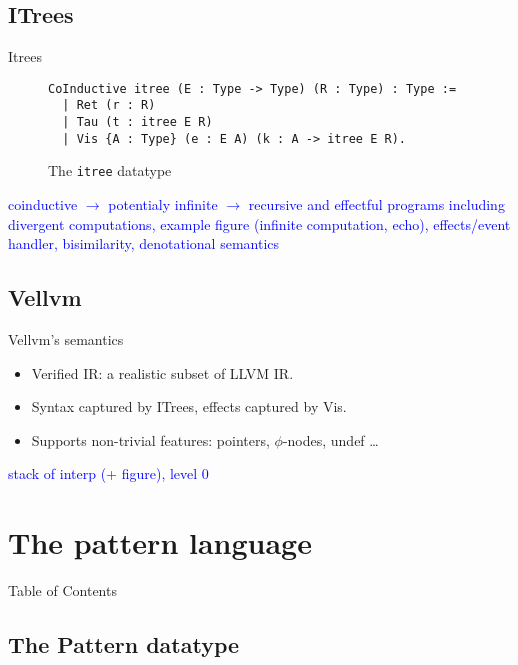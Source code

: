 \documentclass{beamer}
\newcommand{\inlinecoq}[1]{\mbox{\lstinline[style=customcoq,columns=fixed,basewidth=.48em]{#1}}}
\newcommand{\ilc}[1]{\inlinecoq{#1}}
\newcommand{\leon}[1]{\textcolor{blue}{#1}}
\begin{document}
\subsection*{ITrees}

\begin{frame}[fragile]{Itrees}
  \begin{figure}
    \begin{lstlisting}[style=customcoq,basicstyle=\small\ttfamily]
CoInductive itree (E : Type -> Type) (R : Type) : Type :=
  | Ret (r : R)
  | Tau (t : itree E R)
  | Vis {A : Type} (e : E A) (k : A -> itree E R).
  \end{lstlisting}
    \caption{The \ilc{itree} datatype}
    \label{fig:itree}
  \end{figure}
  \leon{coinductive $\rightarrow$ potentialy infinite $\rightarrow$ recursive and effectful programs including divergent computations, example figure (infinite computation, echo), effects/event handler, bisimilarity, denotational semantics}
\end{frame}

\subsection*{Vellvm}

\begin{frame}{Vellvm's semantics}
  \begin{itemize}
    \item Verified IR: a realistic subset of LLVM IR.
    \item Syntax captured by ITrees, effects captured by Vis.
    \item Supports non-trivial features: pointers, $\phi$-nodes, undef \ldots
  \end{itemize}
  \leon{stack of interp (+ figure), level 0}
\end{frame}

\section{The pattern language}

\begin{frame}{Table of Contents}
  \tableofcontents[currentsection]
\end{frame}

\subsection*{The Pattern datatype}
\end{document}
